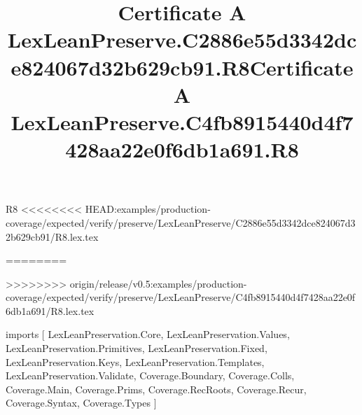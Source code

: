 \begin{lexlean}{R8}
<<<<<<<< HEAD:examples/production-coverage/expected/verify/preserve/LexLeanPreserve/C2886e55d3342dce824067d32b629cb91/R8.lex.tex
\title{Certificate A LexLeanPreserve.C2886e55d3342dce824067d32b629cb91.R8}
========
\title{Certificate A LexLeanPreserve.C4fb8915440d4f7428aa22e0f6db1a691.R8}
>>>>>>>> origin/release/v0.5:examples/production-coverage/expected/verify/preserve/LexLeanPreserve/C4fb8915440d4f7428aa22e0f6db1a691/R8.lex.tex
\begin{coremodule}
imports [
  LexLeanPreservation.Core,
  LexLeanPreservation.Values,
  LexLeanPreservation.Primitives,
  LexLeanPreservation.Fixed,
  LexLeanPreservation.Keys,
  LexLeanPreservation.Templates,
  LexLeanPreservation.Validate,
  Coverage.Boundary,
  Coverage.Colls,
  Coverage.Main,
  Coverage.Prims,
  Coverage.RecRoots,
  Coverage.Recur,
  Coverage.Syntax,
  Coverage.Types
]


\end{coremodule}
\end{lexlean}

